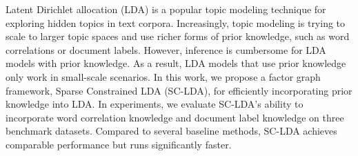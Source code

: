 Latent Dirichlet allocation (LDA) is a popular topic modeling technique for exploring hidden topics in text corpora. Increasingly, topic modeling is trying to scale to larger topic spaces and use richer forms of prior knowledge, such as word correlations or document labels. However, inference is cumbersome for LDA models with prior knowledge. As a result, LDA models that use prior knowledge only work in small-scale scenarios. In this work, we propose a factor graph framework, Sparse Constrained LDA (SC-LDA), for efficiently incorporating prior knowledge into LDA. In experiments, we evaluate SC-LDA's ability to incorporate word correlation knowledge and document label knowledge on three benchmark datasets.  Compared to several baseline methods, SC-LDA achieves comparable performance but runs significantly faster.
